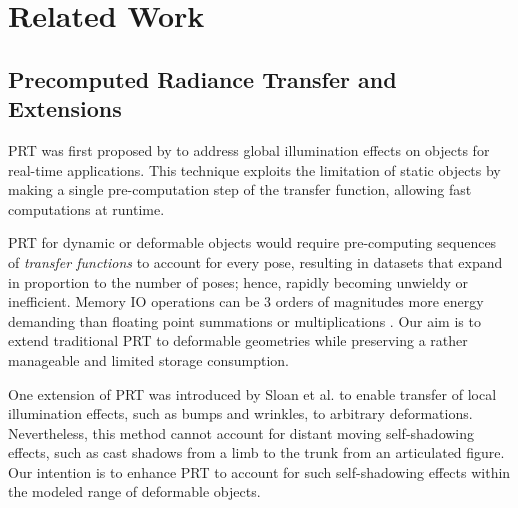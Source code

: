 \section{Related Work}
\subsection*{Precomputed Radiance Transfer and Extensions} 
PRT was first proposed by \cite{sloan2002precomputed} to address global illumination effects on objects for real-time applications. This technique exploits the limitation of static objects by making a single pre-computation step of the transfer function, allowing fast computations at runtime. 

PRT for dynamic or deformable objects would require pre-computing sequences of \textit{transfer functions} to account for every pose, resulting in datasets that expand in proportion to the number of poses; hence, rapidly becoming unwieldy or inefficient. Memory IO operations can be 3 orders of magnitudes more energy demanding than floating point summations or multiplications \cite{ComputingEnergy}. Our aim is to extend traditional PRT to deformable geometries while preserving a rather manageable and limited storage consumption.

One extension of PRT was introduced by Sloan et al.  to enable transfer of local illumination effects, such as bumps and wrinkles, to arbitrary deformations.  Nevertheless, this method cannot account for distant moving self-shadowing effects, such as cast shadows from a limb to the trunk from an articulated figure. Our intention is to enhance PRT to account for such self-shadowing effects within the modeled range of deformable objects.

